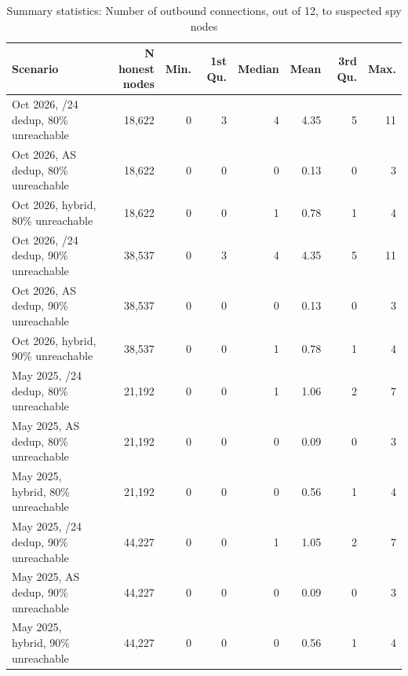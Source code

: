 \begin{table}[t]
\caption{
{\fontsize{20}{25}\selectfont  Summary statistics: Number of outbound connections, out of 12, to suspected spy nodes}
} 
\begin{tabular*}{\linewidth}{@{\extracolsep{\fill}}lrrrrrrr}
\toprule
Scenario & N honest nodes & Min. & 1st Qu. & Median & Mean & 3rd Qu. & Max. \\ 
\midrule\addlinespace[2.5pt]
Oct 2026, /24 dedup, 80\% unreachable & 18,622 & 0 & 3 & 4 & 4.35 & 5 & 11 \\ 
Oct 2026, AS dedup, 80\% unreachable & 18,622 & 0 & 0 & 0 & 0.13 & 0 & 3 \\ 
Oct 2026, hybrid, 80\% unreachable & 18,622 & 0 & 0 & 1 & 0.78 & 1 & 4 \\ 
Oct 2026, /24 dedup, 90\% unreachable & 38,537 & 0 & 3 & 4 & 4.35 & 5 & 11 \\ 
Oct 2026, AS dedup, 90\% unreachable & 38,537 & 0 & 0 & 0 & 0.13 & 0 & 3 \\ 
Oct 2026, hybrid, 90\% unreachable & 38,537 & 0 & 0 & 1 & 0.78 & 1 & 4 \\ 
May 2025, /24 dedup, 80\% unreachable & 21,192 & 0 & 0 & 1 & 1.06 & 2 & 7 \\ 
May 2025, AS dedup, 80\% unreachable & 21,192 & 0 & 0 & 0 & 0.09 & 0 & 3 \\ 
May 2025, hybrid, 80\% unreachable & 21,192 & 0 & 0 & 0 & 0.56 & 1 & 4 \\ 
May 2025, /24 dedup, 90\% unreachable & 44,227 & 0 & 0 & 1 & 1.05 & 2 & 7 \\ 
May 2025, AS dedup, 90\% unreachable & 44,227 & 0 & 0 & 0 & 0.09 & 0 & 3 \\ 
May 2025, hybrid, 90\% unreachable & 44,227 & 0 & 0 & 0 & 0.56 & 1 & 4 \\ 
\bottomrule
\end{tabular*}
\label{table-malicious-connection-summary}
\end{table}
